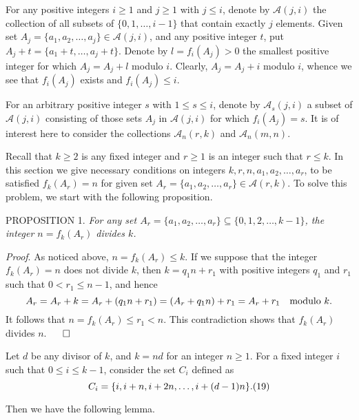 \documentclass[12pt]{amsart}
\begin{document}
{For any positive integers  $i\ge 1$ and $j\ge 1$  with $j\le i$,
denote by ${\mathcal A}(j,i)$ the collection  of all subsets of
$\{0,1,\ldots,i-1\}$ that contain exactly $j$ elements.
Given set $A_j=\{a_1,a_2,\ldots,a_j\}\in {\mathcal A}(j,i)$,
and any positive integer $t$, put $A_j+t=\{a_1+t,\ldots,a_j+t\}$.
 Denote by  $l=f_i (A_j)>0$ the  smallest positive integer for which 
$A_j=A_j+l$ modulo $i$. Clearly, $A_j=A_j+i$ modulo $i$, 
whence we see that $f_i(A_j)$ exists and $f_i (A_j)\le i$. 

For an arbitrary positive integer $s$ with $1\le s\le i$, 
denote by ${\mathcal A}_s(j,i)$ a subset of ${\mathcal A}(j,i)$ consisting
of those sets $A_j$ in  ${\mathcal A}(j,i)$ for which $f_i(A_j)=s$.
It is of interest here to consider the collections ${\mathcal A}_n(r,k)$
and ${\mathcal A}_n(m,n)$. 



Recall that  $k\ge 2$ is any fixed integer and   $r\ge 1$   
is an integer  such that $r\le k$.  In this section we give 
necessary conditions on integers $k,r,n,a_1,a_2,\ldots,a_r$, to be satisfied
$f_k(A_r)=n$ for given set $A_r=\{a_1,a_2,\ldots,a_r\}\in {\mathcal A}(r,k)$.
To solve this problem, we start with the following proposition.

 


\vspace{2mm}

P{\scriptsize ROPOSITION} 1.
{\it For any set $A_r=\{a_1,a_2,\ldots,a_r\}\subseteq 
\{0,1,2,\ldots,k-1\}$, the integer $n=f_k (A_r)$ divides $k$.}
\vspace{2mm} 

{\it Proof}.
As noticed above, $n=f_k (A_r)\le k$. 
If we suppose that the integer $f_k(A_r)=n$ does not divide  
$k$, then $k=q_1n+r_1$ with positive integers $q_1$ and $r_1$such that
  $0< r_1\le n-1$, and hence
$$
A_r=A_r+k=A_r+(q_1n+r_1)=(A_r+q_1n)+r_1=A_r+r_1\quad{\rm modulo}\,\, k.
$$
It follows that $n=f_k(A_r)\le r_1<n$. 
This contradiction shows that $f_k(A_r)$ divides $n$.
\hfill$\qed$
\vspace{2mm} 

Let $d$ be any  divisor of  $k$, and  $k=nd$ for an integer $n\ge 1$.
For a fixed integer $i$ such that $0\le i\le k-1$, consider the set 
$C_i$ defined as
 $$
C_i=\{i,i+n,i+2n,\ldots, i+(d-1)n\}.\relax(19)
 $$

Then we have the following lemma.

\vspace{2mm} 

}
\end{document}
